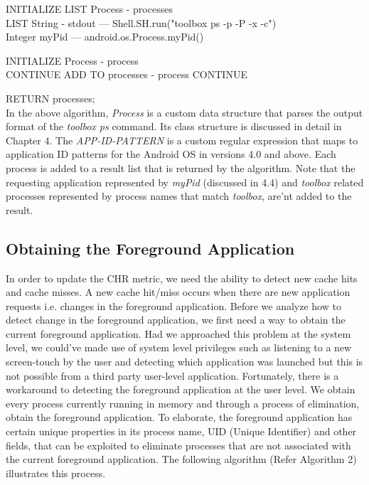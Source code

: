 \documentclass[12pt]{uthesis-v12}  %
\begin{document}
			\begin{algorithm}[H]
				\SetAlgoLined
				
				INITIALIZE LIST Process - processes\\
				LIST String - stdout --- Shell.SH.run("toolbox ps -p -P -x -c")\\
				Integer myPid 		 --- android.os.Process.myPid()
				
				{
					INITIALIZE Process - process\\
					{
						{
							CONTINUE
						}
						{
							ADD TO processes - process
						}
					}
					{
						CONTINUE
					}
				}
				
				RETURN processes;\\
			
			\caption[Algorithm to get list of processes in RAM]{In the above algorithm, {\em Process} is a custom data structure that parses the output format of the {\em toolbox ps} command. Its class structure is discussed in detail in Chapter 4. The {\em APP-ID-PATTERN} is a custom regular expression that maps to application ID patterns for the Android OS in versions 4.0 and above. Each process is added to a result list that is returned by the algorithm. Note that the requesting application represented by {\em myPid} (discussed in 4.4) and {\em toolbox} related processes represented by process names that match {\em toolbox}, are'nt added to the result.}
			\end{algorithm}			
			
		\subsection{Obtaining the Foreground Application}
			In order to update the CHR metric, we need the ability to detect new cache hits and cache misses. A new cache hit/miss occurs when there are new application requests i.e. changes in the foreground application. Before we analyze how to detect change in the foreground application, we first need a way to obtain the current foreground application. Had we approached this problem at the system level, we could've made use of system level privileges such as listening to a new screen-touch by the user and detecting which application was  launched but this is not possible from a third party user-level application. Fortunately, there is a workaround to detecting the foreground application at the user level. We obtain every process currently running in memory and through a process of elimination, obtain the foreground application. To elaborate, the foreground application has certain unique properties in its process name, UID (Unique Identifier) and other fields, that can be exploited to eliminate processes that are not associated with the current foreground application. The following   algorithm (Refer Algorithm 2) illustrates this process.
			
\end{document}
